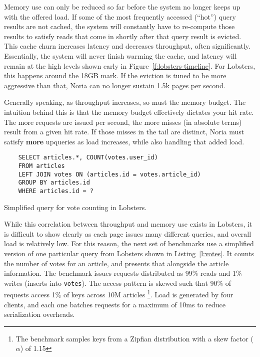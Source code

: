 Memory use can only be reduced so far before the system no longer keeps up with
the offered load. If some of the most frequently accessed (``hot'') query
results are not cached, the system will constantly have to re-compute those
results to satisfy reads that come in shortly after that query result is
evicted. This cache churn increases latency and decreases throughput, often
significantly. Essentially, the system will never finish warming the cache, and
latency will remain at the high levels shown early in
Figure~\ref{f:lobsters-timeline}. For Lobsters, this happens around the 18GB
mark. If the eviction is tuned to be more aggressive than that, Noria can no
longer sustain 1.5k pages per second.

Generally speaking, as throughput increases, so must the memory budget. The
intuition behind this is that the memory budget effectively dictates your hit
rate. The more requests are issued per second, the more misses (in absolute
terms) result from a given hit rate. If those misses in the tail are
distinct, Noria must satisfy \textbf{more} upqueries as load increases, while
also handling that added load.

\begin{listing}[h]
  \begin{verbatim}
    SELECT articles.*, COUNT(votes.user_id)
    FROM articles
    LEFT JOIN votes ON (articles.id = votes.article_id)
    GROUP BY articles.id
    WHERE articles.id = ?
  \end{verbatim}
  \caption{Simplified query for vote counting in Lobsters.}
  \label{l:votes}
\end{listing}

While this correlation between throughput and memory use exists in Lobsters, it
is difficult to show clearly as each page issues many different queries, and
overall load is relatively low. For this reason, the next set of benchmarks use
a simplified version of one particular query from Lobsters shown in
Listing~\ref{l:votes}. It counts the number of votes for an article, and
presents that alongside the article information. The benchmark issues requests
distributed as 99\% reads and 1\% writes (inserts into \texttt{votes}). The
access pattern is skewed such that 90\% of requests access 1\% of keys across
10M articles%
\footnote{The benchmark samples keys from a Zipfian distribution with a skew
factor ($\alpha$) of 1.15}. Load is generated by four clients, and each one
batches requests for a maximum of 10ms to reduce serialization overheads.

